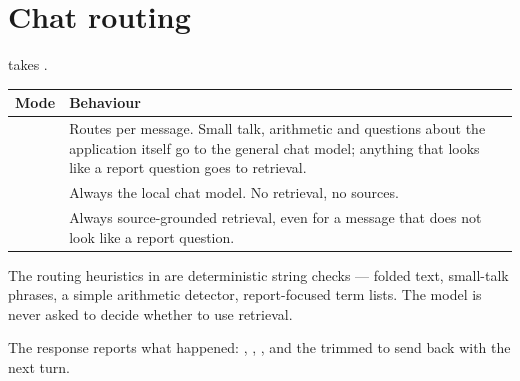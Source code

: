 \section{Chat routing}

 takes .

\begin{longtable}{L{0.14\textwidth} L{0.76\textwidth}}
\toprule
\textbf{Mode} & \textbf{Behaviour} \\
\midrule
\endfirsthead
\bottomrule
\endfoot
{} & Routes per message. Small talk, arithmetic and questions about the
application itself go to the general chat model; anything that looks like a
report question goes to retrieval. \\
 & Always the local chat model. No retrieval, no sources. \\
 & Always source-grounded retrieval, even for a message that does
not look like a report question. \\
\end{longtable}

The routing heuristics in  are deterministic string checks ---
folded text, small-talk phrases, a simple arithmetic detector, report-focused
term lists. The model is never asked to decide whether to use retrieval.

The response reports what happened: ,
, ,  and the
trimmed  to send back with the next turn.
